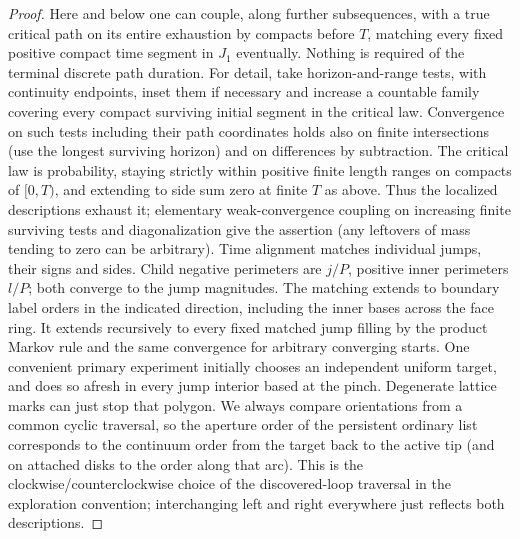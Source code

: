 \begin{proof}
Here and below one can couple, along further subsequences, with a true critical path on its entire exhaustion by compacts before \(T\), matching every fixed positive compact time segment in \(J_1\) eventually.
Nothing is required of the terminal discrete path duration.
For detail, take horizon-and-range tests, with continuity endpoints, inset them if necessary and increase a countable family covering every compact surviving initial segment in the critical law.
Convergence on such tests including their path coordinates holds also on finite intersections (use the longest surviving horizon) and on differences by subtraction.
The critical law is probability, staying strictly within positive finite length ranges on compacts of \([0,T)\), and extending to side sum zero at finite \(T\) as above.
Thus the localized descriptions exhaust it; elementary weak-convergence coupling on increasing finite surviving tests and diagonalization give the assertion (any leftovers of mass tending to zero can be arbitrary).
Time alignment matches individual jumps, their signs and sides.
Child negative perimeters are \(j/P\), positive inner perimeters \(l/P\); both converge to the jump magnitudes.
The matching extends to boundary label orders in the indicated direction, including the inner bases across the face ring.
It extends recursively to every fixed matched jump filling by the product Markov rule and the same convergence for arbitrary converging starts.
One convenient primary experiment initially chooses an independent uniform target, and does so afresh in every jump interior based at the pinch.
Degenerate lattice marks can just stop that polygon.
We always compare orientations from a common cyclic traversal, so the aperture order of the persistent ordinary list corresponds to the continuum order from the target back to the active tip (and on attached disks to the order along that arc).
This is the clockwise/counterclockwise choice of the discovered-loop traversal in the exploration convention; interchanging left and right everywhere just reflects both descriptions.

\end{proof}


